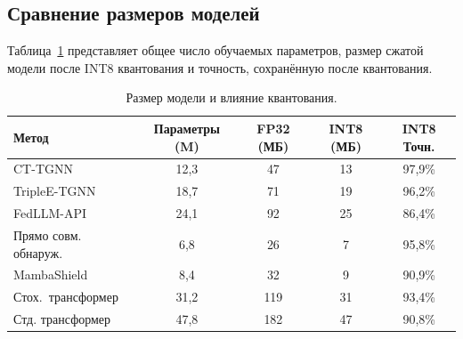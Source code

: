 \subsection{Сравнение размеров моделей}
\label{app:model_size}

Таблица~\ref{tab:app_params} представляет общее число обучаемых параметров, размер сжатой модели после INT8 квантования и точность, сохранённую после квантования.

\begin{table}[htbp]
\centering
\caption{Размер модели и влияние квантования.}
\label{tab:app_params}
\begin{tabular}{lcccc}
\toprule
Метод & Параметры (M) & FP32 (МБ) & INT8 (МБ) & INT8 Точн. \\
\midrule
CT-TGNN            & 12,3 & 47  & 13 & 97,9\% \\
TripleE-TGNN       & 18,7 & 71  & 19 & 96,2\% \\
FedLLM-API         & 24,1 & 92  & 25 & 86,4\% \\
Прямо совм. обнаруж. & 6,8  & 26  & 7  & 95,8\% \\
MambaShield        & 8,4  & 32  & 9  & 90,9\% \\
Стох.\ трансформер  & 31,2 & 119 & 31 & 93,4\% \\
\midrule
Стд. трансформер   & 47,8 & 182 & 47 & 90,8\% \\
\bottomrule
\end{tabular}
\end{table}

